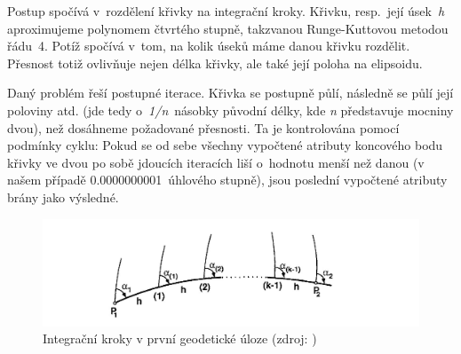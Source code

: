 Postup spočívá v~rozdělení křivky na integrační kroky. Křivku, resp.~její úsek~\textit{h}
aproximujeme polynomem čtvrtého stupně, takzvanou Runge-Kuttovou metodou řádu~4. Potíž spočívá v~tom,
na kolik úseků máme danou křivku rozdělit. Přesnost totiž ovlivňuje nejen délka křivky, ale také její
poloha na elipsoidu. 

Daný problém řeší postupné iterace. Křivka se postupně půlí, následně se půlí její poloviny atd. (jde
tedy o~\textit{1/n}~násobky původní délky, kde \textit{n} představuje mocniny dvou), než dosáhneme
požadované přesnosti. Ta je kontrolována pomocí podmínky cyklu: Pokud se od sebe všechny vypočtené
atributy koncového bodu křivky ve dvou po sobě jdoucích iteracích liší o~hodnotu menší než danou
(v našem případě 0.0000000001~úhlového stupně), jsou poslední vypočtené atributy brány jako výsledné. 


  \begin{figure}[H]
   \centering
	\includegraphics[scale=0.4]{./pictures/prvnigu-integrace.png}
	\caption[Integrační kroky v první geodetické úloze]{Integrační kroky v první geodetické úloze
	(zdroj: \cite{vyssigeodezie})}
      \label{fig:prvnigu-integrace}
  \end{figure}





